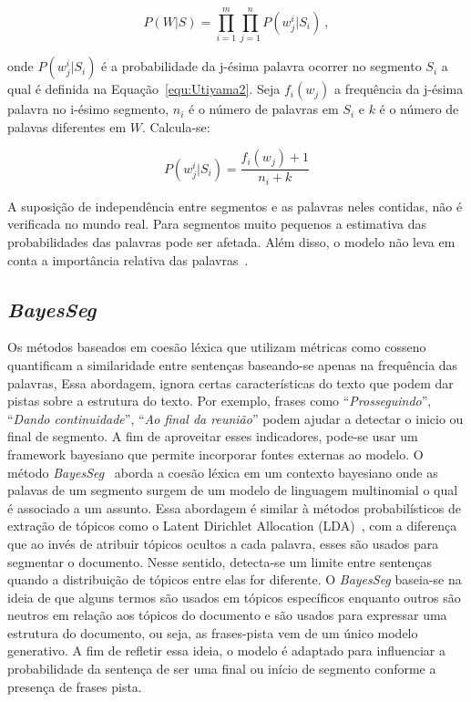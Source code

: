 \begin{equation}
	P(W|S) = \prod_{i=1}^m \prod_{j=1}^n P(w_j^i|S_i) ~ ,
\end{equation}


\noindent
onde $P(w_j^i|S_i)$ é a probabilidade da j-ésima palavra ocorrer no segmento $S_i$ a qual é definida na Equação~\ref{equ:Utiyama2}. Seja $f_i(w_j)$ a frequência da j-ésima palavra no i-ésimo segmento, $n_i$ é o número de palavras em $S_i$ e $k$ é o número de palavas diferentes em $W$. Calcula-se: 

\begin{equation}
	P(w_j^i|S_i) = \frac{f_i(w_j) + 1}{n_i + k}
	\label{equ:Utiyama2}
\end{equation}

A suposição de independência entre segmentos e as palavras neles contidas, não é verificada no mundo real. Para segmentos muito pequenos a estimativa das probabilidades das palavras pode ser afetada. Além disso, o modelo não leva em conta a importância relativa das palavras~\cite{Malioutov:2006a}.

 


\subsection*{\textit{BayesSeg}}

Os métodos baseados em coesão léxica que utilizam métricas como cosseno quantificam a similaridade entre sentenças baseando-se apenas na frequência das palavras, Essa abordagem, ignora certas características do texto que podem dar pistas sobre a estrutura do texto. Por exemplo, frases como ``\textit{Prosseguindo}'', ``\textit{Dando continuidade}'', ``\textit{Ao final da reunião}'' podem ajudar a detectar o inicio ou final de segmento. A fim de aproveitar esses indicadores, pode-se usar um framework bayesiano que permite incorporar fontes externas ao modelo. O método \textit{BayesSeg}~\cite{Eis2008} aborda a coesão léxica em um contexto bayesiano onde as palavas de um segmento surgem de um modelo de linguagem multinomial o qual é associado a um assunto. 
%
Essa abordagem é similar à métodos probabilísticos de extração de tópicos como o Latent Dirichlet Allocation (LDA)~\cite{Blei2003}, com a diferença que ao invés de atribuir tópicos ocultos a cada palavra, esses são usados para segmentar o documento. Nesse sentido, detecta-se um limite entre sentenças quando a distribuição de tópicos entre elas for diferente. O \textit{BayesSeg} baseia-se na ideia de que alguns termos são usados em tópicos específicos enquanto outros são neutros em relação aos tópicos do documento e são usados para expressar uma estrutura do documento, ou seja, as frases-pista vem de um único modelo generativo. A fim de refletir essa ideia, o modelo é adaptado para influenciar a probabilidade da sentença de ser uma final ou início de segmento conforme a presença de frases pista.

